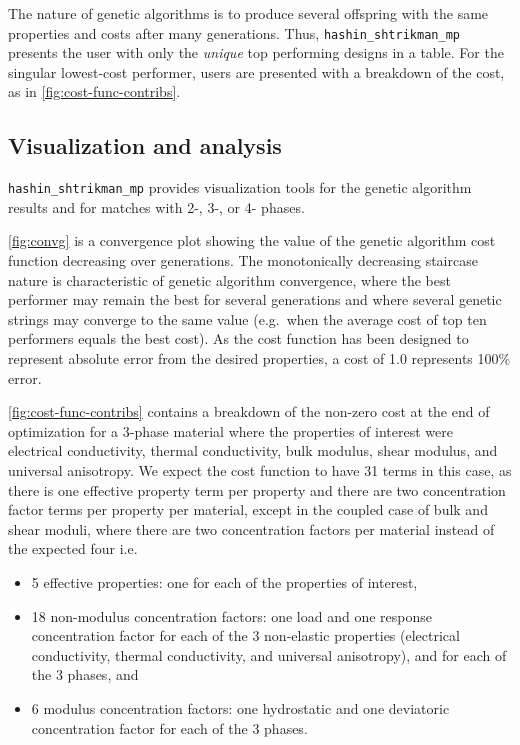The nature of genetic algorithms is to produce several offspring with
the same properties and costs after many generations. Thus,
\texttt{hashin\_shtrikman\_mp} presents the user with only the
\emph{unique} top performing designs in a table. For the singular
lowest-cost performer, users are presented with a breakdown of the cost,
as in \autoref{fig:cost-func-contribs}.

\subsection{Visualization and
analysis}\label{visualization-and-analysis}

\texttt{hashin\_shtrikman\_mp} provides visualization tools for the
genetic algorithm results and for matches with 2-, 3-, or 4- phases.

\autoref{fig:convg} is a convergence plot showing the value of the
genetic algorithm cost function decreasing over generations. The
monotonically decreasing staircase nature is characteristic of genetic
algorithm convergence, where the best performer may remain the best for
several generations and where several genetic strings may converge to
the same value (e.g.~when the average cost of top ten performers equals
the best cost). As the cost function has been designed to represent
absolute error from the desired properties, a cost of 1.0 represents
100\% error.

\autoref{fig:cost-func-contribs} contains a breakdown of the non-zero
cost at the end of optimization for a 3-phase material where the
properties of interest were electrical conductivity, thermal
conductivity, bulk modulus, shear modulus, and universal anisotropy. We
expect the cost function to have 31 terms in this case, as there is one
effective property term per property and there are two concentration
factor terms per property per material, except in the coupled case of
bulk and shear moduli, where there are two concentration factors per
material instead of the expected four i.e.

\begin{itemize}
\item
  5 effective properties: one for each of the properties of interest,
\item
  18 non-modulus concentration factors: one load and one response
  concentration factor for each of the 3 non-elastic properties
  (electrical conductivity, thermal conductivity, and universal
  anisotropy), and for each of the 3 phases, and
\item
  6 modulus concentration factors: one hydrostatic and one deviatoric
  concentration factor for each of the 3 phases.
\end{itemize}

